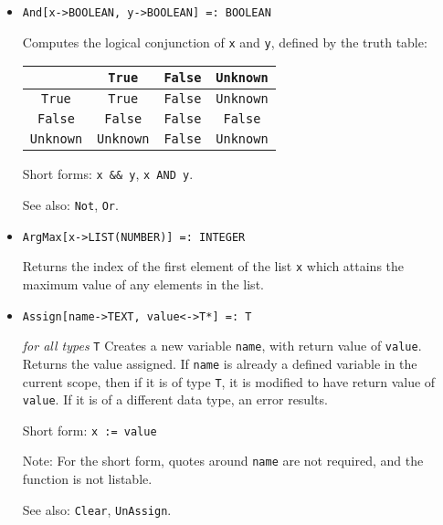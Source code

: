 \begin{itemize}
\item{} 
\protect \large \begin{verbatim}
And[x->BOOLEAN, y->BOOLEAN] =: BOOLEAN 
\end{verbatim} \normalsize

\bd
Computes the logical conjunction of \verb+x+ and \verb+y+, defined by the
truth table:
\begin{center}
\begin{tabular} {|c||c|c|c|} \hline
& \verb+True+ & \verb+False+ & \verb+Unknown+ \\ \hline 
\verb+True+ & \verb+True+ & \verb+False+ & \verb+Unknown+ \\
\verb+False+ & \verb+False+ & \verb+False+ & \verb+False+ \\
\verb+Unknown+ & \verb+Unknown+ & \verb+False+ & \verb+Unknown+ \\ \hline
\end{tabular}
\end{center}

\item [Short forms:] \verb+x && y+, \verb+x AND y+.
\item [See also:] \verb+Not+, \verb+Or+.
\ed



\item{} 
\protect \large \begin{verbatim}
ArgMax[x->LIST(NUMBER)] =: INTEGER 
\end{verbatim} \normalsize

\bd 
Returns the index of the first element of the list \verb+x+ which
attains the maximum value of any elements in the list.  
\ed

\item{} 
\protect \large \begin{verbatim}
Assign[name->TEXT, value<->T*] =: T
\end{verbatim} \normalsize

{\it for all types} {\tt T} 
\bd 
{}
Creates a new variable \verb+name+, with return value of \verb+value+.
Returns the value assigned.  If \verb+name+ is already a defined
variable in the current scope, then if it is of type \verb+T+, it is
modified to have return value of \verb+value+.  If it is of a
different data type, an error results.
 
\item [Short form:] \verb+x := value+
\item [Note:] For the short form, quotes around \verb+name+ are not
required, and the function is not listable.
\item [See also:] \verb+Clear+, \verb+UnAssign+.
\ed


\end{itemize}
